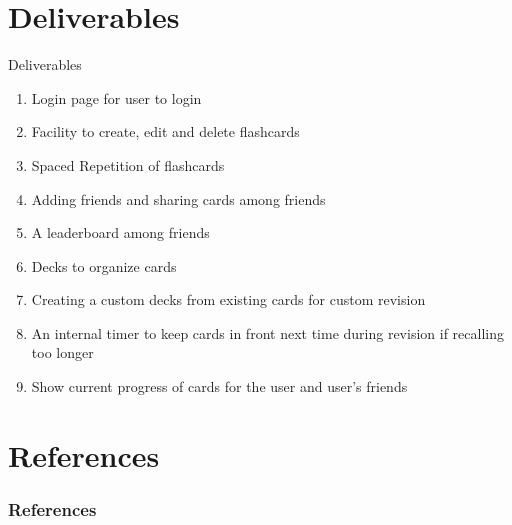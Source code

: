 \documentclass[10pt]{beamer}
\begin{document}
\section{Deliverables}
\begin{frame}{Deliverables}
\begin{enumerate}
    \item Login page for user to login
    \item Facility to create, edit and delete flashcards
    \item Spaced Repetition of flashcards
    \item Adding friends and sharing cards among friends
    \item A leaderboard among friends
    \item Decks to organize cards
    \item Creating a custom decks from existing cards for custom revision
    \item An internal timer to keep cards in front next time during revision if recalling too longer
    \item Show current progress of cards for the user and user's friends
\end{enumerate}
\end{frame}
\section{References}
\begin{frame}
        \frametitle{References}
        \footnotesize
        
\end{frame}
\end{document}
